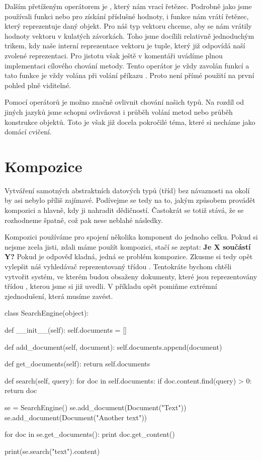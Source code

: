 Dalším přetíženým operátorem je , který nám vrací řetězec. Podrobně jako jsme používali
funkci  nebo  pro získání příslušné hodnoty, i funkce  nám vrátí řetězec,
který reprezentuje daný objekt. Pro náš typ vektoru chceme, aby se nám vrátily hodnoty vektoru v kulatých
závorkách. Toho jsme docílili relativně jednoduchým trikem, kdy naše interní reprezentace vektoru je tuple,
který již odpovídá naší zvolené reprezentaci. Pro jistotu však ještě v komentáři uvádíme plnou implementaci
cílového chování metody. Tento operátor je vždy zavolán funkcí  a tato funkce je vždy volána
při volání příkazu . Proto není přímé použití na první pohled plně viditelné.

Pomocí operátorů je možno značně ovlivnit chování našich typů. Na rozdíl od jiných jazyků jsme schopni
ovlivňovat i průběh volání metod nebo průběh konstrukce objektů. Toto je však již docela pokročilé téma,
které si necháme jako domácí cvičení.

\section{Kompozice}

Vytváření samotných abstraktních datových typů (tříd) bez návaznosti na okolí by asi nebylo příliš zajímavé.
Podívejme se tedy na to, jakým způsobem provádět kompozici a hlavně, kdy ji nahradit dědičností. Častokrát
se totiž stává, že se rozhodneme špatně, což pak nese neblahé následky.

Kompozici používáme pro spojení několika komponent do jednoho celku. Pokud si nejsme zcela jisti,
zdali máme použít kompozici, stačí se zeptat: \textbf{Je X součástí Y?} Pokud je odpověď kladná, jedná
se problém kompozice. Zkusme si tedy opět vylepšit náš vyhledávač reprezentovaný třídou .
Tentokráte bychom chtěli vytvořit
systém, ve kterém budou obsaženy dokumenty, které jsou reprezentovány třídou , kterou jsme si
již uvedli. V příkladu opět pomiňme extrémní zjednodušení, která musíme zavést.

\begin{python}
class SearchEngine(object):

    def __init__(self):
        self.documents = []

    def add_document(self, document):
        self.documents.append(document)

    def get_documents(self):
        return self.documents

    def search(self, query):
        for doc in self.documents:
            if doc.content.find(query) > 0:
                return doc

se = SearchEngine()
se.add_document(Document("Text"))
se.add_document(Document("Another text"))

for doc in se.get_documents():
    print doc.get_content()

print(se.search("text").content)
\end{python}

